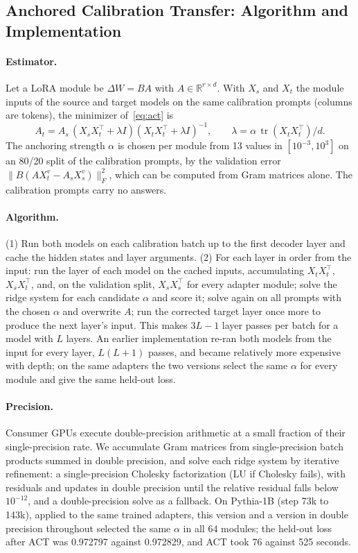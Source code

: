 \documentclass[ijds,blindrev]{informs4}
\begin{document}
\begin{APPENDICES}
\section{Anchored Calibration Transfer: Algorithm and Implementation}\label{app:act}

\paragraph{Estimator.} Let a LoRA module be $\Delta W=BA$ with $A\in\mathbb R^{r\times d}$. With $X_s$ and $X_t$ the module inputs of the source and target models on the same calibration prompts (columns are tokens), the minimizer of~\eqref{eq:act} is
\[
A_t=A_s\,(X_sX_t^{\top}+\lambda I)(X_tX_t^{\top}+\lambda I)^{-1},\qquad \lambda=\alpha\,\operatorname{tr}(X_tX_t^{\top})/d .
\]
The anchoring strength $\alpha$ is chosen per module from 13 values in $[10^{-3},10^{3}]$ on an 80/20 split of the calibration prompts, by the validation error $\|B(AX^v_t-A_sX^v_s)\|_F^2$, which can be computed from Gram matrices alone. The calibration prompts carry no answers.

\paragraph{Algorithm.} (1) Run both models on each calibration batch up to the first decoder layer and cache the hidden states and layer arguments. (2) For each layer in order from the input: run the layer of each model on the cached inputs, accumulating $X_tX_t^\top$, $X_sX_t^\top$, and, on the validation split, $X_sX_s^\top$ for every adapter module; solve the ridge system for each candidate $\alpha$ and score it; solve again on all prompts with the chosen $\alpha$ and overwrite $A$; run the corrected target layer once more to produce the next layer's input. This makes $3L-1$ layer passes per batch for a model with $L$ layers. An earlier implementation re-ran both models from the input for every layer, $L(L+1)$ passes, and became relatively more expensive with depth; on the same adapters the two versions select the same $\alpha$ for every module and give the same held-out loss.

\paragraph{Precision.} Consumer GPUs execute double-precision arithmetic at a small fraction of their single-precision rate. We accumulate Gram matrices from single-precision batch products summed in double precision, and solve each ridge system by iterative refinement: a single-precision Cholesky factorization (LU if Cholesky fails), with residuals and updates in double precision until the relative residual falls below $10^{-12}$, and a double-precision solve as a fallback. On Pythia-1B (step 73k to 143k), applied to the same trained adapters, this version and a version in double precision throughout selected the same $\alpha$ in all 64 modules; the held-out loss after ACT was 0.972797 against 0.972829, and ACT took 76 against 525 seconds.


\end{APPENDICES}
\end{document}
